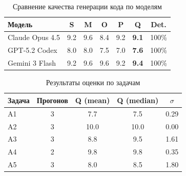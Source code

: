 
\begin{table}[htbp]
\centering
\caption{Сравнение качества генерации кода по моделям}
\label{tab:model-comparison}
\begin{tabular}{lcccccc}
\toprule
Модель & S & M & O & P & Q & Det. \\
\midrule
Claude Opus 4.5 & 9.2 & 9.6 & 8.4 & 9.2 & \textbf{9.1} & 100\% \\
GPT-5.2 Codex & 8.0 & 8.0 & 7.5 & 7.0 & \textbf{7.6} & 100\% \\
Gemini 3 Flash & 9.2 & 9.6 & 9.6 & 9.2 & \textbf{9.4} & 100\% \\
\bottomrule
\end{tabular}
\end{table}

\begin{table}[htbp]
\centering
\caption{Результаты оценки по задачам}
\label{tab:task-results}
\begin{tabular}{lcccc}
\toprule
Задача & Прогонов & Q (mean) & Q (median) & $\sigma$ \\
\midrule
A1 & 3 & 7.7 & 7.5 & 0.29 \\
A2 & 3 & 10.0 & 10.0 & 0.00 \\
A3 & 3 & 8.8 & 9.5 & 1.61 \\
A4 & 2 & 9.8 & 9.8 & 0.35 \\
A5 & 3 & 8.0 & 8.5 & 1.80 \\
\bottomrule
\end{tabular}
\end{table}